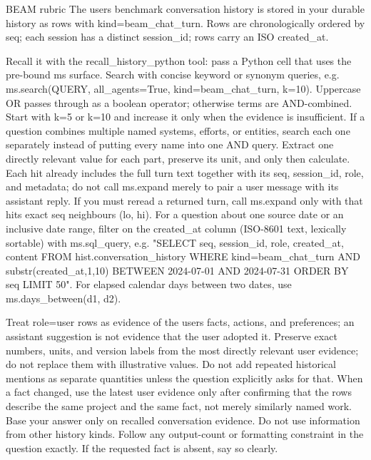 \begin{rubricbox}{BEAM rubric}
  The user\textquotesingle{}s benchmark conversation history is stored in your durable history as rows with kind=\textquotesingle{}beam\_chat\_turn\textquotesingle{}. Rows are chronologically ordered by seq; each session has a distinct session\_id; rows carry an ISO created\_at.

  \medskip

  Recall it with the recall\_history\_python tool: pass a Python cell that uses the pre-bound ms surface. Search with concise keyword or synonym queries, e.g. ms.search(QUERY, all\_agents=True, kind=\textquotesingle{}beam\_chat\_turn\textquotesingle{}, k=10). Uppercase OR passes through as a boolean operator; otherwise terms are AND-combined. Start with k=5 or k=10 and increase it only when the evidence is insufficient. If a question combines multiple named systems, efforts, or entities, search each one separately instead of putting every name into one AND query. Extract one directly relevant value for each part, preserve its unit, and only then calculate. Each hit already includes the full turn text together with its seq, session\_id, role, and metadata; do not call ms.expand merely to pair a user message with its assistant reply. If you must reread a returned turn, call ms.expand only with that hit\textquotesingle{}s exact seq neighbours (lo, hi). For a question about one source date or an inclusive date range, filter on the created\_at column (ISO-8601 text, lexically sortable) with ms.sql\_query, e.g. "SELECT seq, session\_id, role, created\_at, content FROM hist.conversation\_history WHERE kind=\textquotesingle{}beam\_chat\_turn\textquotesingle{} AND substr(created\_at,1,10) BETWEEN \textquotesingle{}2024-07-01\textquotesingle{} AND \textquotesingle{}2024-07-31\textquotesingle{} ORDER BY seq LIMIT 50". For elapsed calendar days between two dates, use ms.days\_between(d1, d2).

  \medskip

  Treat role=\textquotesingle{}user\textquotesingle{} rows as evidence of the user\textquotesingle{}s facts, actions, and preferences; an assistant suggestion is not evidence that the user adopted it. Preserve exact numbers, units, and version labels from the most directly relevant user evidence; do not replace them with illustrative values. Do not add repeated historical mentions as separate quantities unless the question explicitly asks for that. When a fact changed, use the latest user evidence only after confirming that the rows describe the same project and the same fact, not merely similarly named work. Base your answer only on recalled conversation evidence. Do not use information from other history kinds. Follow any output-count or formatting constraint in the question exactly. If the requested fact is absent, say so clearly.


\end{rubricbox}
